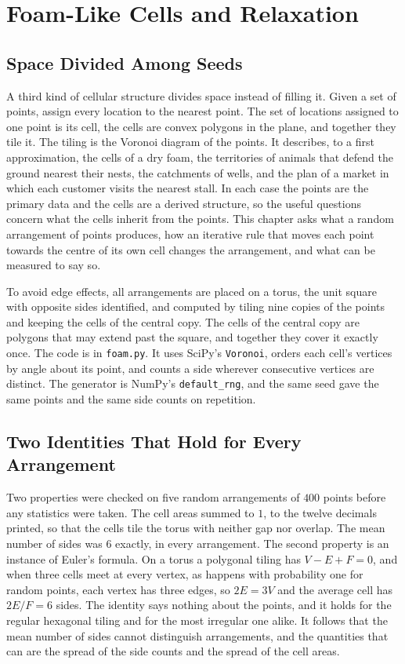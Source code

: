 \chapter{Foam-Like Cells and Relaxation}

\section{Space Divided Among Seeds}

A third kind of cellular structure divides space instead of filling it. Given a set of points, assign every location to the nearest point. The set of locations assigned to one point is its cell, the cells are convex polygons in the plane, and together they tile it. The tiling is the Voronoi diagram of the points. It describes, to a first approximation, the cells of a dry foam, the territories of animals that defend the ground nearest their nests, the catchments of wells, and the plan of a market in which each customer visits the nearest stall. In each case the points are the primary data and the cells are a derived structure, so the useful questions concern what the cells inherit from the points. This chapter asks what a random arrangement of points produces, how an iterative rule that moves each point towards the centre of its own cell changes the arrangement, and what can be measured to say so.

To avoid edge effects, all arrangements are placed on a torus, the unit square with opposite sides identified, and computed by tiling nine copies of the points and keeping the cells of the central copy. The cells of the central copy are polygons that may extend past the square, and together they cover it exactly once. The code is in \texttt{foam.py}. It uses SciPy's \texttt{Voronoi}, orders each cell's vertices by angle about its point, and counts a side wherever consecutive vertices are distinct. The generator is NumPy's \texttt{default\_rng}, and the same seed gave the same points and the same side counts on repetition.

\section{Two Identities That Hold for Every Arrangement}

Two properties were checked on five random arrangements of $400$ points before any statistics were taken. The cell areas summed to $1$, to the twelve decimals printed, so that the cells tile the torus with neither gap nor overlap. The mean number of sides was $6$ exactly, in every arrangement. The second property is an instance of Euler's formula. On a torus a polygonal tiling has $V-E+F=0$, and when three cells meet at every vertex, as happens with probability one for random points, each vertex has three edges, so $2E=3V$ and the average cell has $2E/F=6$ sides. The identity says nothing about the points, and it holds for the regular hexagonal tiling and for the most irregular one alike. It follows that the mean number of sides cannot distinguish arrangements, and the quantities that can are the spread of the side counts and the spread of the cell areas.

